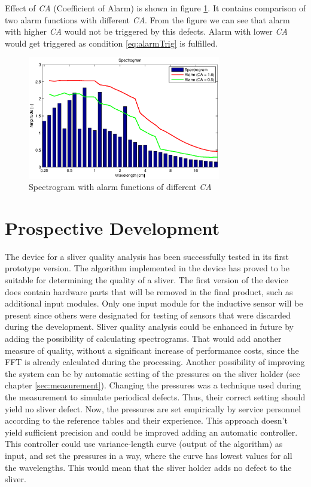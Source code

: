 \documentclass[twoside]{ctuthesis}
\theoremstyle{plain}
\theoremstyle{definition}
\theoremstyle{note}
\begin{document}
Effect of \textit{CA} (Coefficient of Alarm) is shown in figure \ref{fig:alarm2}. It contains comparison of two alarm functions with different \textit{CA}. From the figure we can see that alarm with higher \textit{CA} would not be triggered by this defects. Alarm with lower \textit{CA} would get triggered as condition \ref{eq:alarmTrig} is fulfilled.
\begin{figure}[h]
	\centering
	\includegraphics[width=0.75\textwidth]{moire1_alarm.eps}
	\caption{Spectrogram with alarm functions of different \textit{CA}}
	\label{fig:alarm2}
\end{figure}
\chapter{Prospective Development}
The device for a sliver quality analysis has been successfully tested in its first prototype version. The algorithm implemented in the device has proved to be suitable for determining the quality of a sliver. The first version of the device does contain hardware parts that will be removed in the final product, such as additional input modules. Only one input module for the inductive sensor will be present since others were designated for testing of sensors that were discarded during the development.
Sliver quality analysis could be enhanced in future by adding the possibility of calculating spectrograms. That would add another measure of quality, without a significant increase of performance costs, since the FFT is already calculated during the processing. 
Another possibility of improving the system can be by automatic setting of the pressures on the sliver holder (see chapter \ref{sec:measurement}). Changing the pressures was a technique used during the measurement to simulate periodical defects. Thus, their correct setting should yield no sliver defect. Now, the pressures are set empirically by service personnel according to the reference tables and their experience. This approach doesn't yield sufficient precision and could be improved adding an automatic controller. This controller could use variance-length curve (output of the algorithm) as input, and set the pressures in a way, where the curve has lowest values for all the wavelengths. This would mean that the sliver holder adds no defect to the sliver.
\end{document}
